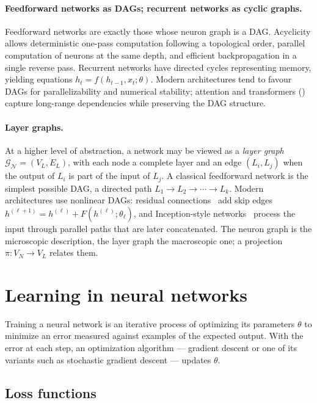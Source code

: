 \paragraph{Feedforward networks as DAGs; recurrent networks as cyclic graphs.}
Feedforward networks are exactly those whose neuron graph is a DAG. Acyclicity
allows deterministic one-pass computation following a topological order, parallel
computation of neurons at the same depth, and efficient backpropagation in a
single reverse pass. Recurrent networks have directed cycles representing memory,
yielding equations $h_t = f(h_{t-1}, x_t; \theta)$. Modern architectures tend to
favour DAGs for parallelizability and numerical stability; attention and
transformers () capture long-range dependencies while
preserving the DAG structure.

\paragraph{Layer graphs.}
At a higher level of abstraction, a network may be viewed as a \emph{layer
graph} $\mathcal{G}_{\mathcal{N}} = (V_L, E_L)$, with each node a complete layer
and an edge $(L_i, L_j)$ when the output of $L_i$ is part of the input of $L_j$.
A classical feedforward network is the simplest possible DAG, a directed path
$L_1 \to L_2 \to \cdots \to L_k$. Modern architectures use nonlinear DAGs:
residual connections~\citep{he2016deep} add skip edges
$h^{(\ell+1)} = h^{(\ell)} + F(h^{(\ell)}; \theta_\ell)$, and Inception-style
networks~\citep{szegedy2015going} process the input through parallel paths that
are later concatenated. The neuron graph is the microscopic description, the
layer graph the macroscopic one; a projection $\pi : V_N \to V_L$ relates them.

\section{Learning in neural networks}
\label{sec:found:learning}

Training a neural network is an iterative process of optimizing its parameters
$\theta$ to minimize an error measured against examples of the expected output.
With the error at each step, an optimization algorithm --- gradient descent or
one of its variants such as stochastic gradient descent --- updates $\theta$.

\subsection{Loss functions}
\label{sec:found:loss}

